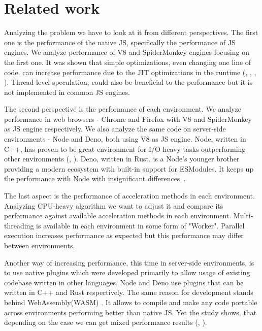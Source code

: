 \section{Related work}
Analyzing the problem we have to look at it from different perspectives. The first one is the performance of the native JS, specifically the performance of JS engines. We analyze performance of V8 and SpiderMonkey engines focusing on the first one. It was shown that simple optimizations, even changing one line of code, can increase performance due to the JIT optimizations in the runtime (\cite{meurer_2017}, \cite{meurer_2019}, \cite{gong2015jitprof}, \cite{selakovic2016performance}). Thread-level speculation, could also be beneficial to the performance \cite{martinsen2017combining} but it is not implemented in common JS engines.

The second perspective is the performance of each environment. We analyze performance in web browsers - Chrome and Firefox with V8 and SpiderMonkey as JS engine respectively. We also analyze the same code on server-side environments - Node and Deno, both using V8 as JS engine. Node, written in C++, has proven to be great environment for I/O heavy tasks outperforming other environments (\cite{lei2014performance}, \cite{chitra2017performance}). Deno, written in Rust, is a Node's younger brother providing a modern ecosystem with built-in support for ESModules. It keeps up the performance with Node with insignificant differences~\cite{choubey_2021}.

The last aspect is the performance of acceleration methods in each environment. Analyzing CPU-heavy algorithm we want to adjust it and compare its performance against available acceleration methods in each environment. Multi-threading is available in each environment in some form of "Worker". Parallel execution increases performance as expected \cite{djarv2020performance} but this performance may differ between environments. 

Another way of increasing performance, this time in server-side environments, is to use native plugins which were developed primarily to allow usage of existing codebase written in other languages. Node and Deno use plugins that can be written in C++ and Rust respectively. The same reason for development stands behind WebAssembly(WASM) \cite{niessen2020webassembly}. It allows to compile and make any code portable across environments performing better than native JS. Yet the study shows, that depending on the case we can get mixed performance results (\cite{yan2021understanding}, \cite{jangda2019not}). 

